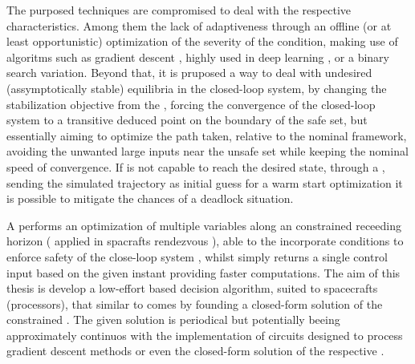 The purposed techniques are compromised to deal with the respective characteristics. Among them the lack of adaptiveness through an offline (or at least opportunistic) optimization of the severity of the  condition, making use of algoritms such as gradient descent \cite{ruder2016overview}, highly used in deep learning \cite{tian2023recent}, or a binary search \cite{lin2019binary} variation. Beyond that, it is pruposed a way to deal with undesired (assymptotically stable) equilibria in the closed-loop system, by changing the stabilization objective from the , forcing the convergence of the closed-loop system to a transitive deduced point on the boundary of the safe set, but essentially aiming to optimize the path taken, relative to the nominal  framework, avoiding the unwanted large inputs near the unsafe set while keeping the nominal speed of convergence. If is not capable to reach the desired state, through a , sending the simulated trajectory as initial guess for a warm start optimization it is possible to mitigate the chances of a deadlock situation. 



A  performs an optimization of multiple variables along an constrained receeding horizon ( applied in spacrafts rendezvous \cite{hartley2015tutorial, kaczmarek2023autonomous}), able to the incorporate  conditions to enforce safety of the close-loop system  \cite{grandia2021multi}, whilst  simply returns a single control input based on the given instant providing  faster computations.
The aim of this thesis is develop a low-effort  based decision algorithm, suited to spacecrafts (processors), that similar to \cite{matias2025hybrid, reis2020control} comes by founding a closed-form solution of the constrained . The given solution is periodical but potentially beeing approximately continuos with the implementation of circuits designed to process gradient descent methods or even the closed-form solution of the respective  \cite{hao2025analysis}.

